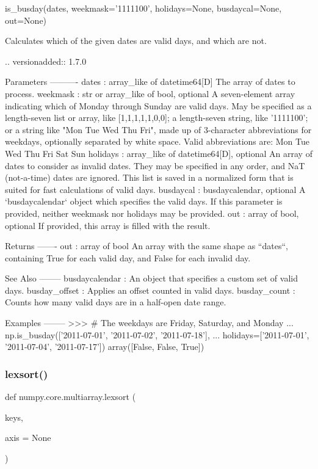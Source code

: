 \begin{DoxyVerb}is_busday(dates, weekmask='1111100', holidays=None, busdaycal=None, out=None)

Calculates which of the given dates are valid days, and which are not.

.. versionadded:: 1.7.0

Parameters
----------
dates : array_like of datetime64[D]
    The array of dates to process.
weekmask : str or array_like of bool, optional
    A seven-element array indicating which of Monday through Sunday are
    valid days. May be specified as a length-seven list or array, like
    [1,1,1,1,1,0,0]; a length-seven string, like '1111100'; or a string
    like "Mon Tue Wed Thu Fri", made up of 3-character abbreviations for
    weekdays, optionally separated by white space. Valid abbreviations
    are: Mon Tue Wed Thu Fri Sat Sun
holidays : array_like of datetime64[D], optional
    An array of dates to consider as invalid dates.  They may be
    specified in any order, and NaT (not-a-time) dates are ignored.
    This list is saved in a normalized form that is suited for
    fast calculations of valid days.
busdaycal : busdaycalendar, optional
    A `busdaycalendar` object which specifies the valid days. If this
    parameter is provided, neither weekmask nor holidays may be
    provided.
out : array of bool, optional
    If provided, this array is filled with the result.

Returns
-------
out : array of bool
    An array with the same shape as ``dates``, containing True for
    each valid day, and False for each invalid day.

See Also
--------
busdaycalendar : An object that specifies a custom set of valid days.
busday_offset : Applies an offset counted in valid days.
busday_count : Counts how many valid days are in a half-open date range.

Examples
--------
>>> # The weekdays are Friday, Saturday, and Monday
... np.is_busday(['2011-07-01', '2011-07-02', '2011-07-18'],
...                 holidays=['2011-07-01', '2011-07-04', '2011-07-17'])
array([False, False,  True])
\end{DoxyVerb}
 \mbox{\label{namespacenumpy_1_1core_1_1multiarray_abfde7e15583dd7dc27427359107e9db9}} 
\subsubsection{\texorpdfstring{lexsort()}{lexsort()}}
{\footnotesize\ttfamily def numpy.\+core.\+multiarray.\+lexsort (\begin{DoxyParamCaption}\item[{}]{keys,  }\item[{}]{axis = {\ttfamily None} }\end{DoxyParamCaption})}

